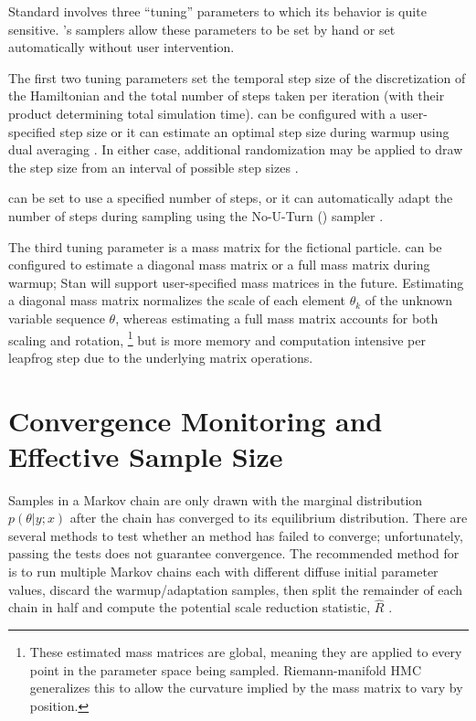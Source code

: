 Standard \HMC involves three ``tuning'' parameters to which its
behavior is quite sensitive.  \Stan's samplers allow these parameters
to be set by hand or set automatically without user intervention.

The first two tuning parameters set the temporal step size of the
discretization of the Hamiltonian and the total number of steps taken
per iteration (with their product determining total simulation time).
\Stan can be configured with a user-specified step size or it can
estimate an optimal step size during warmup using dual averaging
\citep{Nesterov:2009, Hoffman-Gelman:2012}.  In either case,
additional randomization may be applied to draw the step size from an
interval of possible step sizes \citep{Neal:2011}.

\Stan can be set to use a specified number of steps, or it can
automatically adapt the number of steps during sampling using the
No-U-Turn (\NUTS) sampler \citep{Hoffman-Gelman:2012}.  

The third tuning parameter is a mass matrix for the fictional
particle.  \Stan can be configured to estimate a diagonal mass matrix
or a full mass matrix during warmup; Stan will support user-specified
mass matrices in the future.  Estimating a diagonal mass matrix
normalizes the scale of each element $\theta_k$ of the unknown
variable sequence $\theta$, whereas estimating a full mass matrix
accounts for both scaling and rotation,%
%
\footnote{These estimated mass matrices are global, meaning they are
  applied to every point in the parameter space being sampled.
  Riemann-manifold HMC generalizes this to allow the curvature implied
  by the mass matrix to vary by position.}
%
but is more memory and computation intensive per leapfrog step due to
the underlying matrix operations.

\section{Convergence Monitoring and Effective Sample Size}

Samples in a Markov chain are only drawn with the marginal
distribution $p(\theta|y;x)$ after the chain has converged to its
equilibrium distribution.  There are several methods to test whether
an \MCMC method has failed to converge; unfortunately, passing the
tests does not guarantee convergence.  The recommended method for
\Stan is to run multiple Markov chains each with different diffuse
initial parameter values, discard the warmup/adaptation samples, then
split the remainder of each chain in half and compute the potential
scale reduction statistic, $\hat{R}$ \citep{GelmanRubin:1992}.

